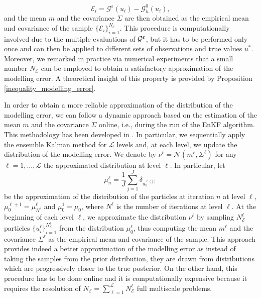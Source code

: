 \[ \mathcal{E}_i = \mathcal{G}^{\varepsilon}(u_i) - \mathcal{G}^0_h(u_i), \]
and the mean $m$ and the covariance $\Sigma$ are then obtained as the empirical mean and covariance of the sample $\{\mathcal E_i\}_{i=1}^{N_{\mathcal E}}$. This procedure is computationally involved due to the multiple evaluations of $\mathcal G^\varepsilon$, but it has to be performed only once and can then be applied to different sets of observations and true values $u^*$. Moreover, we remarked in practice via numerical experiments that a small number $N_{\mathcal E}$ can be employed to obtain a satisfactory approximation of the modelling error. A theoretical insight of this property is provided by Proposition \ref{inequality_modelling_error}.

In order to obtain a more reliable approximation of the distribution of the modelling error, we can follow a dynamic approach based on the estimation of the mean $m$ and the covariance $\Sigma$ online, i.e., during the run of the EnKF algorithm. This methodology has been developed in \cite{CDS18}. In particular, we sequentially apply the ensemble Kalman method for $\mathcal{L}$ levels and, at each level, we update the distribution of the modelling error. We denote by $\nu^{\ell} = \mathcal{N}(m^{\ell}, \Sigma^{\ell})$ for any $\ell = 1, \dots, \mathcal{L}$ the approximated distribution at level $\ell$. In particular, let
\[ \mu_n^{\ell} = \frac{1}{J} \sum_{j=1}^J \delta_{u^{\ell (j)}_n} \]
be the approximation of the distribution of the particles at iteration $n$ at level $\ell$, $\mu_0^{\ell + 1} = \mu_{N^{\ell}}^{\ell}$ and $\mu_0^1 = \mu_0$, where $N^{\ell}$ is the number of iterations at level $\ell$. At the beginning of each level $\ell$, we approximate the distribution $\nu^{\ell}$ by sampling $N_{\mathcal{E}}^{\ell}$ particles $\{ u_i^{\ell} \}_{i=1}^{N_{\mathcal{E}}^{\ell}}$ from the distribution $\mu_0^{\ell}$, thus  computing the mean $m^{\ell}$ and the covariance $\Sigma^{\ell}$ as the empirical mean and covariance of the sample. This approach provides indeed a better approximation of the modelling error as instead of taking the samples from the prior distribution, they are drawn from distributions which are progressively closer to the true posterior. On the other hand, this procedure has to be done online and it is computationally expensive because it requires the resolution of $N_{\mathcal{E}} = \sum_{\ell=1}^{\mathcal{L}} N_{\mathcal{E}}^{\ell}$ full multiscale problems.

